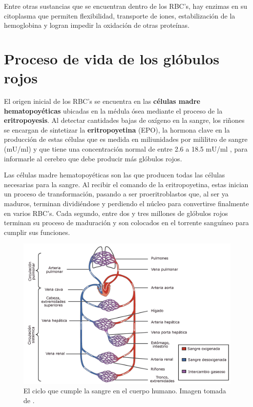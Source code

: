Entre otras sustancias que se encuentran dentro de los RBC's, hay enzimas en su citoplasma que permiten flexibilidad, transporte de iones, estabilización de la hemoglobina y logran impedir la oxidación de otras proteínas.

\section{Proceso de vida de los glóbulos rojos}\label{sec:RBC:vida}

El origen inicial de los RBC's se encuentra en las \textbf{células madre hematopoyéticas} ubicadas en la médula ósea mediante el proceso de la \textbf{eritropoyesis}. Al detectar cantidades bajas de oxígeno en la sangre, los riñones se encargan de sintetizar la \textbf{eritropoyetina} (EPO), la hormona clave en la producción de estas células que es medida en miliunidades por mililitro de sangre (mU/ml) y que tiene una concentración normal de entre 2.6 a 18.5 mU/ml , para informarle al cerebro que debe producir más glóbulos rojos. 

Las células madre hematopoyéticas son las que producen todas las células necesarias para la sangre. Al recibir el comando de la eritropoyetina, estas inician un proceso de transformación, pasando a ser proeritroblastos que, al ser ya maduros, terminan dividiéndose y perdiendo el núcleo para convertirse finalmente en varios RBC's. Cada segundo, entre dos y tres millones de glóbulos rojos terminan su proceso de maduración y son colocados en el torrente sanguíneo para cumplir sus funciones.

\begin{figure}[H]
    \centering
    \includegraphics[scale=0.2]{figures/CicloSangre.jpg}
    \caption{El ciclo que cumple la sangre en el cuerpo humano. Imagen tomada de \cite{eswiki:159489943}.}
    \label{sec:RBC:fig:CicloSangre}
\end{figure}

